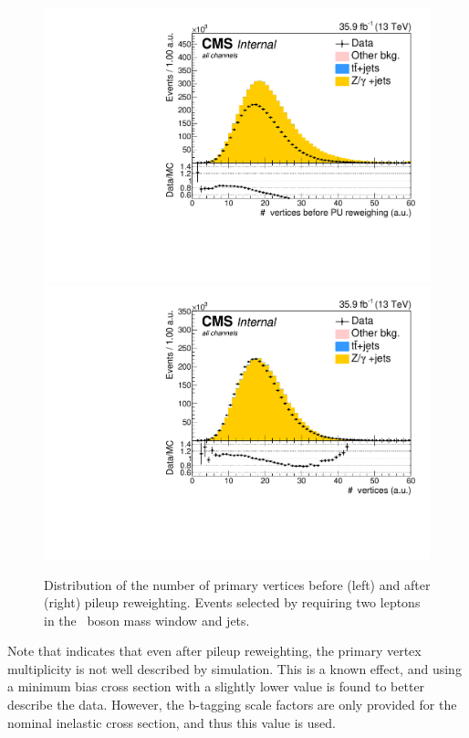 \begin{figure}[htbp]
	\centering	
	\includegraphics[width=0.49\linewidth]{5_Eventselection/Figures/Reweighing/2lepcontrol_dilep_NbOfVertices_bfPU_all_Stack}
	\includegraphics[width=0.49\linewidth]{5_Eventselection/Figures/Reweighing/2lepcontrol_dilep_NbOfVertices_all_Stack}
	\caption{Distribution of the number of primary vertices before (left) and after (right) pileup reweighting. Events selected by requiring two leptons in the \PZ\ boson mass window and jets.}
	\label{fig:nbvertices}
\end{figure}

Note that  indicates that even after pileup reweighting, the primary vertex multiplicity is not well described by simulation. This is a known effect, and using  a minimum bias cross section with a slightly lower value is found to better describe the data. However, the b-tagging scale factors are only provided for the nominal inelastic cross section, and thus this value is used.


